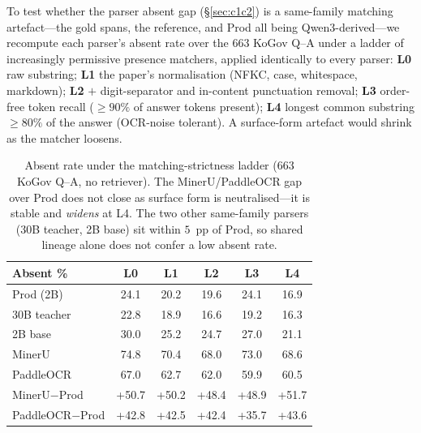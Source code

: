 \documentclass[11pt]{article}
\begin{document}
To test whether the parser absent gap (\S\ref{sec:c1c2}) is a same-family matching artefact---the gold spans, the reference, and Prod all being Qwen3-derived---we recompute each parser's absent rate over the 663 KoGov Q--A under a ladder of increasingly permissive presence matchers, applied identically to every parser: \textbf{L0} raw substring; \textbf{L1} the paper's normalisation (NFKC, case, whitespace, markdown); \textbf{L2} $+$ digit-separator and in-content punctuation removal; \textbf{L3} order-free token recall ($\ge\!90\%$ of answer tokens present); \textbf{L4} longest common substring $\ge\!80\%$ of the answer (OCR-noise tolerant). A surface-form artefact would shrink as the matcher loosens.

\begin{table}[h]
\centering\scriptsize
\setlength{\tabcolsep}{3pt}
\begin{tabular}{lccccc}
\toprule
Absent \% & L0 & L1 & L2 & L3 & L4 \\
\midrule
Prod (2B) & 24.1 & 20.2 & 19.6 & 24.1 & 16.9 \\
30B teacher & 22.8 & 18.9 & 16.6 & 19.2 & 16.3 \\
2B base & 30.0 & 25.2 & 24.7 & 27.0 & 21.1 \\
MinerU & 74.8 & 70.4 & 68.0 & 73.0 & 68.6 \\
PaddleOCR & 67.0 & 62.7 & 62.0 & 59.9 & 60.5 \\
\midrule
MinerU$-$Prod & +50.7 & +50.2 & +48.4 & +48.9 & +51.7 \\
PaddleOCR$-$Prod & +42.8 & +42.5 & +42.4 & +35.7 & +43.6 \\
\bottomrule
\end{tabular}
\caption{Absent rate under the matching-strictness ladder (663 KoGov Q--A, no retriever). The MinerU/PaddleOCR gap over Prod does not close as surface form is neutralised---it is stable and \emph{widens} at L4. The two other same-family parsers (30B teacher, 2B base) sit within $5$~pp of Prod, so shared lineage alone does not confer a low absent rate.}
\label{tab:familyneutral}
\end{table}
\end{document}
